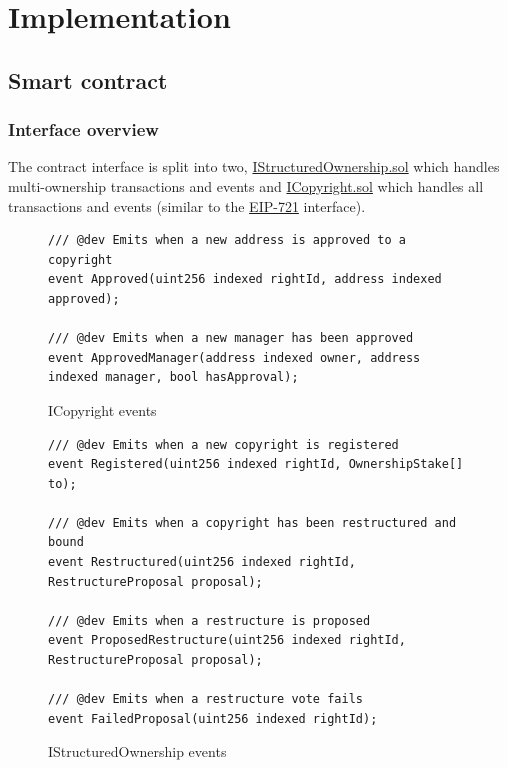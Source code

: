 \section{Implementation}

\subsection{Smart contract}

\subsubsection{Interface overview}


The contract interface is split into two, \href{https://github.com/MrHarrisonBarker/CRPL/blob/main/CRPL.Contracts/contracts/IStructuredOwnership.sol}{IStructuredOwnership.sol} which handles multi-ownership transactions and events and \href{https://github.com/MrHarrisonBarker/CRPL/blob/main/CRPL.Contracts/contracts/ICopyright.sol}{ICopyright.sol} which handles all  transactions and events (similar to the \href{https://eips.ethereum.org/EIPS/eip-721}{EIP-721} interface).

\begin{figure}[H]
\caption{ICopyright events}
\begin{lstlisting}[language=Solidity]
/// @dev Emits when a new address is approved to a copyright
event Approved(uint256 indexed rightId, address indexed approved);

/// @dev Emits when a new manager has been approved
event ApprovedManager(address indexed owner, address indexed manager, bool hasApproval);
\end{lstlisting}
\end{figure}

\begin{figure}[H]
\caption{IStructuredOwnership events}
\centering
\begin{lstlisting}[language=Solidity]
/// @dev Emits when a new copyright is registered
event Registered(uint256 indexed rightId, OwnershipStake[] to);

/// @dev Emits when a copyright has been restructured and bound
event Restructured(uint256 indexed rightId, RestructureProposal proposal);

/// @dev Emits when a restructure is proposed
event ProposedRestructure(uint256 indexed rightId, RestructureProposal proposal);

/// @dev Emits when a restructure vote fails
event FailedProposal(uint256 indexed rightId);
\end{lstlisting}
\end{figure}

